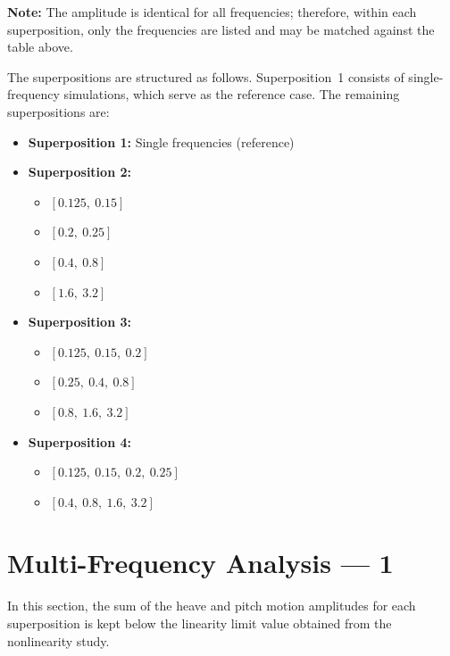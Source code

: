 \documentclass[../main]{subfiles}
\begin{document}
\textbf{Note:} The amplitude is identical for all frequencies; therefore, within each superposition, 
only the frequencies are listed and may be matched against the table above.

The superpositions are structured as follows. Superposition~1 consists of single-frequency simulations, 
which serve as the reference case. The remaining superpositions are:

\begin{itemize}
    \item \textbf{Superposition 1:} Single frequencies (reference)

    \item \textbf{Superposition 2:}
    \begin{itemize}
        \item $[0.125,\ 0.15]$
        \item $[0.2,\ 0.25]$
        \item $[0.4,\ 0.8]$
        \item $[1.6,\ 3.2]$
    \end{itemize}

    \item \textbf{Superposition 3:}
    \begin{itemize}
        \item $[0.125,\ 0.15,\ 0.2]$
        \item $[0.25,\ 0.4,\ 0.8]$
        \item $[0.8,\ 1.6,\ 3.2]$
    \end{itemize}

    \item \textbf{Superposition 4:}
    \begin{itemize}
        \item $[0.125,\ 0.15,\ 0.2,\ 0.25]$
        \item $[0.4,\ 0.8,\ 1.6,\ 3.2]$
    \end{itemize}
\end{itemize}

\section{Multi-Frequency Analysis --- 1}

In this section, the sum of the heave and pitch motion amplitudes for each 
superposition is kept below the linearity limit value obtained from the nonlinearity study.
\end{document}
